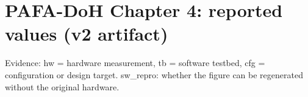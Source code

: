 \documentclass[10pt,a4paper,landscape]{article}
\begin{document}
\section*{PAFA-DoH Chapter 4: reported values (v2 artifact)}
Evidence: hw = hardware measurement, tb = software testbed, cfg = configuration or design target.
sw\_repro: whether the figure can be regenerated without the original hardware.


\end{document}
